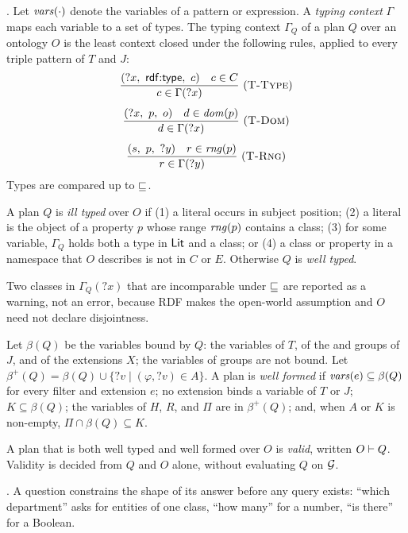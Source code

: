 .
Let $\mathit{vars}(\cdot)$ denote the variables of a pattern or expression.
A \emph{typing context} $\Gamma$ maps each variable to a set of types.
The typing context $\Gamma_Q$ of a plan $Q$ over an ontology $O$ is
the least context closed under the following rules, applied to every
triple pattern of $T$ and $J$:
\begin{gather*}
\frac{(?x,\ \kw{rdf{:}type},\ c) \quad c \in C}{c \in \Gamma(?x)}\ (\textsc{T-Type})
\\[1ex]
\frac{(?x,\ p,\ o) \quad d \in \dom(p)}{d \in \Gamma(?x)}\ (\textsc{T-Dom})
\\[1ex]
\frac{(s,\ p,\ ?y) \quad r \in \rng(p)}{r \in \Gamma(?y)}\ (\textsc{T-Rng})
\end{gather*}
Types are compared up to $\sqsubseteq$.

\begin{definition}
\label{def-typed}
A plan $Q$ is \emph{ill typed} over $O$ if
(1) a literal occurs in subject position;
(2) a literal is the object of a property $p$ whose range $\mathit{rng}(p)$
contains a class;
(3) for some variable, $\Gamma_Q$ holds both a type in $\mathsf{Lit}$ and a
class; or
(4) a class or property in a namespace that $O$ describes is not in
$C$ or $E$.
Otherwise $Q$ is \emph{well typed}.
\end{definition}

Two classes in $\Gamma_Q(?x)$ that are incomparable under $\sqsubseteq$ are
reported as a warning, not an error, because RDF makes the open-world
assumption and $O$ need not declare disjointness.

\begin{definition}
\label{def-formed}
Let $\beta(Q)$ be the variables bound by $Q$: the variables of $T$,
of the  and  groups of $J$, and of the extensions
$X$; the variables of  groups are not bound.
Let $\beta^+(Q) = \beta(Q) \cup \{?v \mid (\varphi, ?v) \in A\}$.
A plan is \emph{well formed} if
$\mathit{vars}(e) \subseteq \beta(Q)$ for every filter and extension $e$;
no extension binds a variable of $T$ or $J$;
$K \subseteq \beta(Q)$;
the variables of $H$, $R$, and $\Pi$ are in $\beta^+(Q)$; and,
when $A$ or $K$ is non-empty, $\Pi \cap \beta(Q) \subseteq K$.
\end{definition}

A plan that is both well typed and well formed over $O$ is
\emph{valid}, written $O \vdash Q$.
Validity is decided from $Q$ and $O$ alone, without evaluating $Q$
on $\mathcal{G}$.

.
A question constrains the shape of its answer before any query exists:
``which department'' asks for entities of one class, ``how many'' for a
number, ``is there'' for a Boolean.

